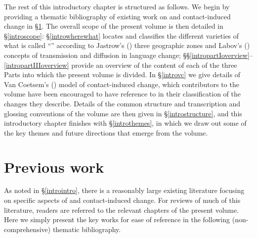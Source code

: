 \documentclass[output=paper]{langsci/langscibook}
\begin{document}
The rest of this introductory chapter is structured as follows. We begin by providing a thematic bibliography of existing work on  and contact-induced change in §\ref{introexistingwork}. The overall scope of the present volume is then detailed in §\ref{introscope}: §\ref{introwherewhat} locates and classifies the different varieties of what is called ``'' according to Jastrow's (\citeyear{Jastrow2002}) three geographic zones and Labov's (\citeyear{Labov2007}) concepts of {transmission} and {diffusion} in {language change}; §§\ref{intropartIoverview}--\ref{intropartIIIoverview} provide an overview of the content of each of the three Parts into which the present volume is divided. In §\ref{introvc} we give details of Van Coetsem's (\citeyear{VanCoetsem1988,VanCoetsem2000}) model of contact-induced change, which contributors to the volume have been encouraged to have reference to in their classification of the changes they describe. Details of the common structure and transcription and glossing conventions of the volume are then given in §\ref{introstructure}, and this introductory chapter finishes with §\ref{introthemes}, in which we draw out some of the key themes and {future} directions that emerge from the volume.


\section{Previous work}\label{introexistingwork}

As noted in §\ref{introintro}, there is a reasonably large existing literature {focusing} on specific aspects of  and contact-induced change. For reviews of much of this literature, readers are referred to the relevant chapters of the present volume. Here we simply present the key works for ease of reference in the following (non-comprehensive) thematic bibliography.
\end{document}
